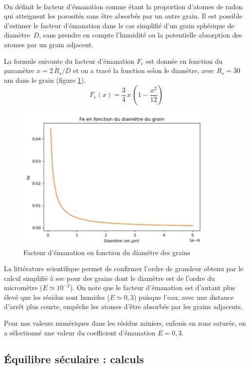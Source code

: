 \documentclass{article}
\begin{document}
\paragraph{} On définit le facteur d’émanation comme étant la proportion d’atomes de radon qui atteignent les porosités sans être absorbés par un autre grain. Il est possible d’estimer le facteur d’émanation \cite{fleischer_theory_1983} dans le cas simplifié d’un grain sphérique de diamètre~$D$, sans prendre en compte l’humidité ou la potentielle absorption des atomes par un grain adjacent. 

La formule suivante du facteur d'émanation $F_e$ est donnée en fonction du paramètre $x=2\,R_s/D$ et on a tracé la fonction selon le diamètre, avec $R_s=30$ nm dans le grain (figure \ref{fig:facteur_emanation}).
$$
F_e (x)= \frac{3}{4} \,x\,(1- \frac{x^2}{12} )
$$

\begin{figure}[H]
    \centering
    \includegraphics[width=10cm]{II_A2_2.png}
    \caption{Facteur d’émanation en fonction du diamètre des grains}
    \label{fig:facteur_emanation}
\end{figure}

La littérature scientifique \cite{ferry_migration_2000} permet de confirmer l’ordre de grandeur obtenu par le calcul simplifié à sec pour des grains dont le diamètre est de l’ordre du micromètre ($E \simeq 10^{-2}$). On note que le facteur d’émanation est d’autant plus élevé que les résidus sont humides ($E\simeq 0,3$) puisque l’eau, avec une distance d’arrêt plus courte, empêche les atomes d’être absorbés par les grains adjacents.

Pour nos valeurs numériques dans les résidus miniers, enfouis en zone saturée, on a sélectionné une valeur du coefficient d’émanation $E=0,3$.

\subsection{Équilibre séculaire : calculs }
\label{annexe:seculaire}
\end{document}
